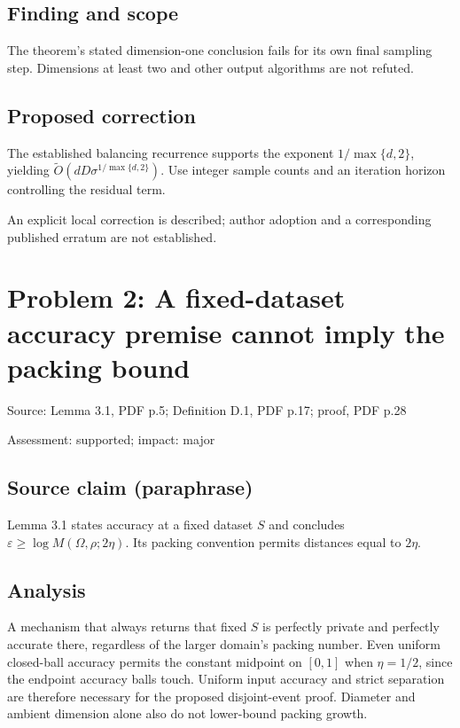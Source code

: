 \documentclass[11pt]{article}
\begin{document}
\subsection*{Finding and scope}

The theorem’s stated dimension-one conclusion fails for its own final sampling step. Dimensions at least two and other output algorithms are not refuted.

\subsection*{Proposed correction}

The established balancing recurrence supports the exponent \(1/\max\{d,2\}\), yielding \(\widetilde O(dD\sigma^{1/\max\{d,2\}})\). Use integer sample counts and an iteration horizon controlling the residual term.

An explicit local correction is described; author adoption and a corresponding published erratum are not established.

\section*{Problem 2: A fixed-dataset accuracy premise cannot imply the packing bound}

Source: Lemma 3.1, PDF p.5; Definition D.1, PDF p.17; proof, PDF p.28

Assessment: supported; impact: major

\subsection*{Source claim (paraphrase)}

Lemma 3.1 states accuracy at a fixed dataset \(S\) and concludes \(\varepsilon\geq\log M(\Omega,\rho;2\eta)\). Its packing convention permits distances equal to \(2\eta\).

\subsection*{Analysis}

A mechanism that always returns that fixed \(S\) is perfectly private and perfectly accurate there, regardless of the larger domain’s packing number. Even uniform closed-ball accuracy permits the constant midpoint on \([0,1]\) when \(\eta=1/2\), since the endpoint accuracy balls touch. Uniform input accuracy and strict separation are therefore necessary for the proposed disjoint-event proof. Diameter and ambient dimension alone also do not lower-bound packing growth.
\end{document}
